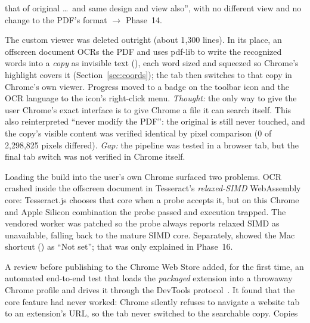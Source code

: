 \begin{description}[leftmargin=1.4em, style=nextline, itemsep=4pt]
        that of original \dots\ and same design and view also'', with no
        different view and no change to the PDF's format $\rightarrow$ Phase~14.
  \item[Phase 14 --- Native viewer only: the searchable-scan sandwich.] The
        custom viewer was deleted outright (about 1{,}300 lines). In its place, an
        offscreen document OCRs the PDF and uses pdf-lib to write the recognized
        words into a \emph{copy} as invisible text (), each word sized
        and squeezed so Chrome's highlight covers it (Section~\ref{sec:coords});
        the tab then switches to that copy in Chrome's own viewer. Progress moved
        to a badge on the toolbar icon and the OCR language to the icon's
        right-click menu. \emph{Thought:} the only way to give the user Chrome's
        exact interface is to give Chrome a file it can search itself. This also
        reinterpreted ``never modify the PDF'': the original is still never
        touched, and the copy's visible content was verified identical by pixel
        comparison (0 of 2{,}298{,}825 pixels differed). \emph{Gap:} the pipeline
        was tested in a browser tab, but the final tab switch was not verified in
        Chrome itself.
  \item[Phase 15 --- First use in the user's browser.] Loading the build into the
        user's own Chrome surfaced two problems. OCR crashed inside the offscreen
        document in Tesseract's \emph{relaxed-SIMD} WebAssembly core: Tesseract.js
        chooses that core when a  probe accepts it,
        but on this Chrome and Apple Silicon combination the probe passed and
        execution trapped. The vendored worker was patched so the probe always
        reports relaxed SIMD as unavailable, falling back to the mature SIMD core.
        Separately,  showed the Mac shortcut
        () as ``Not set''; that was only explained in
        Phase~16.
  \item[Phase 16 --- Release hardening, verified in real Chrome.] A review before
        publishing to the Chrome Web Store added, for the first time, an
        automated end-to-end test that loads the \emph{packaged} extension into a
        throwaway Chrome profile and drives it through the DevTools
        protocol~\cite{cdp}. It found that the core feature had never worked:
        Chrome silently refuses to navigate a website tab to an extension's
         URL, so the tab never switched to the searchable copy. Copies

\end{description}
